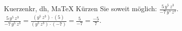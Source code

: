 \begin{MAufgabe}{Kuerzen}{kr, dh, MaTeX}
K\"urzen Sie soweit m\"oglich: $\frac{5\, y^5\, z^3}{- 7\, y^5\, z^3}$.\\ 
\ifLsg\MLoesung
\quad $\frac{5\, y^5\, z^3}{- 7\, y^5\, z^3}=\frac{(y^5\, z^3)\cdot(5)}{(y^5\, z^3)\cdot(-7)}=\frac{5}{-7}=\frac{-5}{7}$.\else\relax\fi
 \end{MAufgabe}